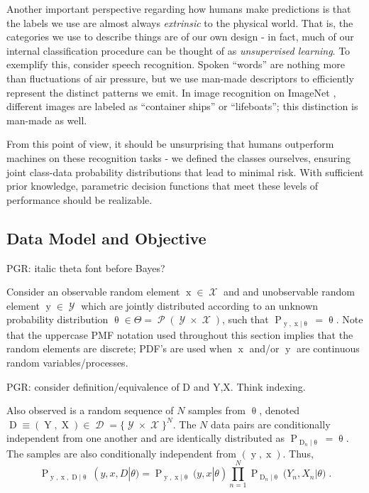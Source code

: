 \documentclass[12pt]{article}
\DeclareMathOperator{\xrm}{\mathrm{x}}
\DeclareMathOperator{\Xrm}{\mathrm{X}}
\DeclareMathOperator{\yrm}{\mathrm{y}}
\DeclareMathOperator{\Yrm}{\mathrm{Y}}
\DeclareMathOperator{\Drm}{\mathrm{D}}
\DeclareMathOperator{\Prm}{\mathrm{P}}
\DeclareMathOperator{\Xcal}{\mathcal{X}}
\DeclareMathOperator{\Ycal}{\mathcal{Y}}
\DeclareMathOperator{\Dcal}{\mathcal{D}}
\DeclareMathOperator{\Pcal}{\mathcal{P}}
\begin{document}
Another important perspective regarding how humans make predictions is that the labels we use are almost always \emph{extrinsic} to the physical world. That is, the categories we use to describe things are of our own design - in fact, much of our internal classification procedure can be thought of as \emph{unsupervised learning}. To exemplify this, consider speech recognition. Spoken ``words'' are nothing more than fluctuations of air pressure, but we use man-made descriptors to efficiently represent the distinct patterns we emit. In image recognition on ImageNet \cite{krizhevsky}, different images are labeled as ``container ships'' or ``lifeboats''; this distinction is man-made as well.

From this point of view, it should be unsurprising that humans outperform machines on these recognition tasks - we defined the classes ourselves, ensuring joint class-data probability distributions that lead to minimal risk. With sufficient prior knowledge, parametric decision functions that meet these levels of performance should be realizable. 











\subsection{Data Model and Objective}

PGR: italic theta font before Bayes?

Consider an observable random element $\xrm \in \Xcal$ and and unobservable random element $\yrm \in \Ycal$ which are jointly distributed according to an unknown probability distribution $\uptheta \in \Theta = \Pcal(\Ycal \times \Xcal)$, such that $\Prm_{\yrm,\xrm | \uptheta} = \uptheta$. Note that the uppercase PMF notation used throughout this section implies that the random elements are discrete; PDF's are used when $\xrm$ and/or $\yrm$ are continuous random variables/processes.

PGR: consider definition/equivalence of D and Y,X. Think indexing.

Also observed is a random sequence of $N$ samples from $\uptheta$, denoted $\Drm \equiv ( \Yrm,\Xrm ) \in \Dcal = \{\Ycal \times \Xcal\}^N$. The $N$ data pairs are conditionally independent from one another and are identically distributed as $\Prm_{\Drm_n | \uptheta} = \uptheta$. The samples are also conditionally independent from $(\yrm,\xrm)$. Thus,
\begin{equation}
\Prm_{\yrm,\xrm,\Drm | \uptheta}(y,x,D | \theta) = \Prm_{\yrm,\xrm | \uptheta}(y,x | \theta) \prod_{n=1}^N \Prm_{\Drm_n | \uptheta}\big(Y_n,X_n | \theta\big) \;.
\end{equation}
\end{document}
